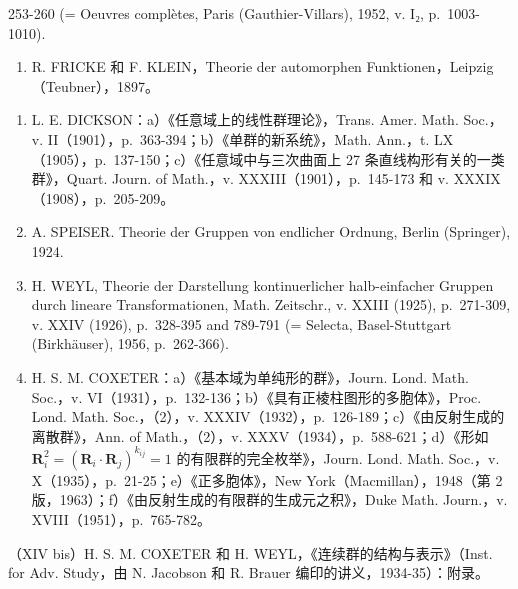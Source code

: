 253-260 (= Oeuvres complètes, Paris (Gauthier-Villars), 1952, v. I₂, p.~1003-1010).

\begin{enumerate}
\def\labelenumi{(\Alph{enumi})}
\setcounter{enumi}{23}
\tightlist
\item
  R. FRICKE 和 F. KLEIN，Theorie der automorphen Funktionen，Leipzig（Teubner），1897。
\end{enumerate}

\begin{enumerate}
\def\labelenumi{(\Roman{enumi})}
\setcounter{enumi}{10}
\item
  L. E. DICKSON：a）《任意域上的线性群理论》，Trans. Amer. Math. Soc.，v. II（1901），p.~363-394；b）《单群的新系统》，Math. Ann.，t. LX（1905），p.~137-150；c）《任意域中与三次曲面上 27 条直线构形有关的一类群》，Quart. Journ. of Math.，v. XXXIII（1901），p.~145-173 和 v. XXXIX（1908），p.~205-209。
\item
  A. SPEISER. Theorie der Gruppen von endlicher Ordnung, Berlin (Springer), 1924.
\item
  H. WEYL, Theorie der Darstellung kontinuerlicher halb-einfacher Gruppen durch lineare Transformationen, Math. Zeitschr., v. XXIII (1925), p.~271-309, v. XXIV (1926), p.~328-395 and 789-791 (= Selecta, Basel-Stuttgart (Birkhäuser), 1956, p.~262-366).
\item
  H. S. M. COXETER：a）《基本域为单纯形的群》，Journ. Lond. Math. Soc.，v. VI（1931），p.~132-136；b）《具有正棱柱图形的多胞体》，Proc. Lond. Math. Soc.，（2），v. XXXIV（1932），p.~126-189；c）《由反射生成的离散群》，Ann. of Math.，（2），v. XXXV（1934），p.~588-621；d）《形如 \(\mathbf{R}_i^2 = (\mathbf{R}_i\cdot \mathbf{R}_j)^{k_{ij}} = 1\) 的有限群的完全枚举》，Journ. Lond. Math. Soc.，v. X（1935），p.~21-25；e）《正多胞体》，New York（Macmillan），1948（第 2 版，1963）；f）《由反射生成的有限群的生成元之积》，Duke Math. Journ.，v. XVIII（1951），p.~765-782。
\end{enumerate}

（XIV bis）H. S. M. COXETER 和 H. WEYL，《连续群的结构与表示》（Inst. for Adv. Study，由 N. Jacobson 和 R. Brauer 编印的讲义，1934-35）：附录。


